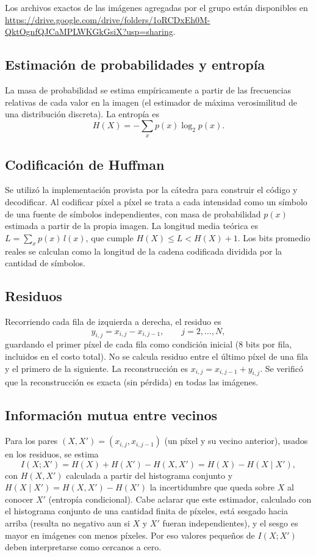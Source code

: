\documentclass[11pt,a4paper]{article}
\begin{document}
Los archivos exactos de las imágenes agregadas por el grupo están disponibles en \url{https://drive.google.com/drive/folders/1oRCDxEh0M-QktOgnfQJCaMPLWKGkGsiX?usp=sharing}.

\subsection{Estimación de probabilidades y entropía}
La masa de probabilidad se estima empíricamente a partir de las frecuencias relativas de cada valor en la imagen (el estimador de máxima verosimilitud de una distribución discreta). La entropía es
\begin{equation}
H(X) = -\sum_x p(x)\log_2 p(x).
\end{equation}

\subsection{Codificación de Huffman}
Se utilizó la implementación provista por la cátedra para construir el código y decodificar. Al codificar píxel a píxel se trata a cada intensidad como un símbolo de una fuente de símbolos independientes, con masa de probabilidad $p(x)$ estimada a partir de la propia imagen.
La longitud media teórica es $L=\sum_x p(x)\,l(x)$, que cumple $H(X)\le L<H(X)+1$. Los bits promedio reales se calculan como la longitud de
la cadena codificada dividida por la cantidad de símbolos.

\subsection{Residuos}
Recorriendo cada fila de izquierda a derecha, el residuo es
\begin{equation}
y_{i,j}=x_{i,j}-x_{i,j-1},\qquad j=2,\dots,N,
\end{equation}
guardando el primer píxel de cada fila como condición inicial (8 bits por fila, incluidos en el costo total). 
No se calcula residuo entre el último píxel de una fila y el primero de la siguiente. La reconstrucción es $x_{i,j}=x_{i,j-1}+y_{i,j}$. 
Se verificó que la reconstrucción es exacta (sin pérdida) en todas las imágenes.

\subsection{Información mutua entre vecinos}
Para los pares $(X,X')=(x_{i,j},x_{i,j-1})$ (un píxel y su vecino anterior), usados en los residuos, se estima
\begin{equation}
I(X;X')=H(X)+H(X')-H(X,X')=H(X)-H(X\mid X'),
\end{equation}
con $H(X,X')$ calculada a partir del histograma conjunto y $H(X\mid X')=H(X,X')-H(X')$ la incertidumbre que queda sobre $X$ al conocer $X'$ (entropía condicional).
Cabe aclarar que este estimador, calculado con el histograma conjunto de una cantidad finita de píxeles, está sesgado hacia arriba
(resulta no negativo aun si $X$ y $X'$ fueran independientes), y el sesgo es mayor en imágenes con menos píxeles. Por eso valores pequeños de $I(X;X')$ deben interpretarse como cercanos a cero.
\end{document}
